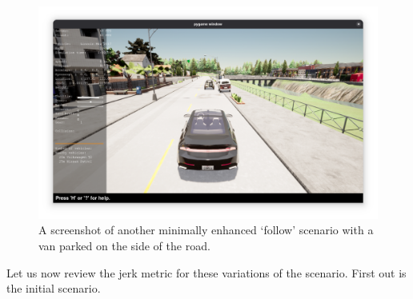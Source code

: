\begin{figure}[htb]
    \centering
    \includegraphics[width=\textwidth]{experiment-material/follow-minimally-enhanced-2-startpoint.png}
    \caption{A screenshot of another minimally enhanced `follow' scenario with a van parked on the
        side of the road.}\label{fig:followMinimallyEnhanced2StartPoint}
\end{figure}


Let us now review the jerk metric for these variations of the scenario. First out is the initial
scenario.

